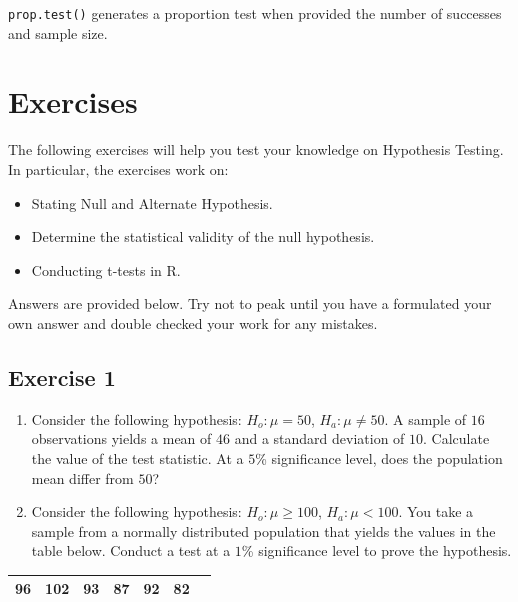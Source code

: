 \documentclass[
  letterpaper,
  DIV=11,
  numbers=noendperiod]{scrreprt}
\begin{document}
\texttt{prop.test()} generates a proportion test when provided the
number of successes and sample size.

\hypertarget{exercises-12}{%
\section{Exercises}\label{exercises-12}}

The following exercises will help you test your knowledge on Hypothesis
Testing. In particular, the exercises work on:

\begin{itemize}
\item
  Stating Null and Alternate Hypothesis.
\item
  Determine the statistical validity of the null hypothesis.
\item
  Conducting t-tests in R.
\end{itemize}

Answers are provided below. Try not to peak until you have a formulated
your own answer and double checked your work for any mistakes.

\hypertarget{exercise-1-24}{%
\subsection*{Exercise 1}\label{exercise-1-24}}

\begin{enumerate}
\def\labelenumi{\arabic{enumi}.}
\item
  Consider the following hypothesis: \(H_{o}: \mu=50\),
  \(H_{a}: \mu \neq 50\). A sample of \(16\) observations yields a mean
  of \(46\) and a standard deviation of \(10\). Calculate the value of
  the test statistic. At a \(5\)\% significance level, does the
  population mean differ from \(50\)?
\item
  Consider the following hypothesis: \(H_{o}: \mu \geq 100\),
  \(H_{a}: \mu < 100\). You take a sample from a normally distributed
  population that yields the values in the table below. Conduct a test
  at a \(1\)\% significance level to prove the hypothesis.
\end{enumerate}

\begin{longtable}[]{@{}lllllll@{}}
\toprule()
\endhead
96 & 102 & 93 & 87 & 92 & 82 & \\
\bottomrule()
\end{longtable}
\end{document}
